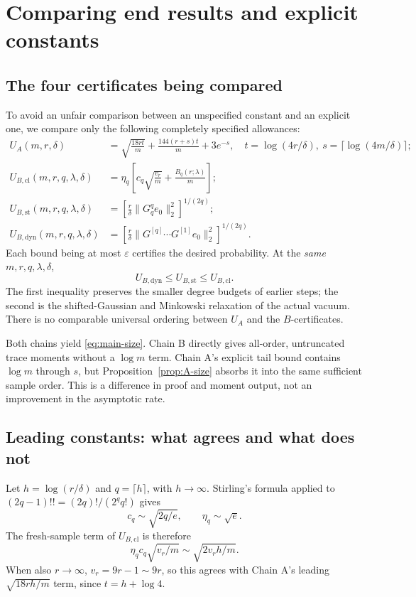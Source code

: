 \documentclass[11pt]{article}
\numberwithin{equation}{section}
\theoremstyle{definition}\newtheorem{definition}[theorem]{Definition}
\theoremstyle{remark}\newtheorem{remark}[theorem]{Remark}
\newcommand{\norm}[1]{\lVert#1\rVert}\newcommand{\ip}[2]{\langle#1,#2\rangle}
\begin{document}
\section{Comparing end results and explicit constants}\label{sec:comparison}
\subsection{The four certificates being compared}
To avoid an unfair comparison between an unspecified constant and an explicit
one, we compare only the following completely specified allowances:
\begin{align}
 U_A(m,r,\delta)
 &=\sqrt{\frac{18rt}{m}}+\frac{144(r+s)t}{m}+3e^{-s},
 \quad t=\log(4r/\delta),\ s=\lceil\log(4m/\delta)\rceil;
 \label{eq:UA}\\
 U_{B,\mathrm{cl}}(m,r,q,\lambda,\delta)
 &=\eta_q\left[c_q\sqrt{\frac{v_r}{m}}+\frac{B_q(r;\lambda)}m\right];
 \label{eq:UBclosed}\\
 U_{B,\mathrm{st}}(m,r,q,\lambda,\delta)
 &=\left[\frac r\delta\norm{G_q^qe_0}_2^2\right]^{1/(2q)};
 \label{eq:UBstatic}\\
 U_{B,\mathrm{dyn}}(m,r,q,\lambda,\delta)
 &=\left[\frac r\delta\norm{G^{[q]}\cdots G^{[1]}e_0}_2^2\right]^{1/(2q)}.
 \label{eq:UBdynamic}
\end{align}
Each bound being at most $\varepsilon$ certifies the desired probability.
At the \emph{same} $m,r,q,\lambda,\delta$,
\begin{equation}\label{eq:B-hierarchy}
 U_{B,\mathrm{dyn}}\le U_{B,\mathrm{st}}\le U_{B,\mathrm{cl}}.
\end{equation}
The first inequality preserves the smaller degree budgets of earlier steps;
the second is the shifted-Gaussian and Minkowski relaxation of the actual vacuum.
There is no comparable universal ordering between $U_A$ and the $B$-certificates.

Both chains yield \eqref{eq:main-size}. Chain B directly gives all-order,
untruncated trace moments without a $\log m$ term. Chain A's explicit tail bound
contains $\log m$ through $s$, but Proposition~\ref{prop:A-size} absorbs it into
the same sufficient sample order. This is a difference in proof and moment
output, not an improvement in the asymptotic rate.

\subsection{Leading constants: what agrees and what does not}
Let $h=\log(r/\delta)$ and $q=\lceil h\rceil$, with $h\to\infty$.
Stirling's formula applied to $(2q-1)!!=(2q)!/(2^qq!)$ gives
\[
 c_q\sim\sqrt{2q/e},\qquad\eta_q\sim\sqrt e.
\]
The fresh-sample term of $U_{B,\mathrm{cl}}$ is therefore
\begin{equation}\label{eq:variance-asymptotic}
 \eta_qc_q\sqrt{v_r/m}\sim\sqrt{2v_rh/m}.
\end{equation}
When also $r\to\infty$, $v_r=9r-1\sim9r$, so this agrees with Chain A's
leading $\sqrt{18rh/m}$ term, since $t=h+\log4$.
\end{document}
